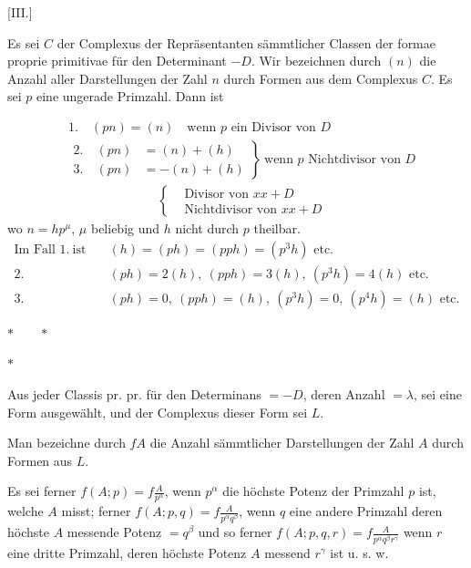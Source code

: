 \par\bigskip{}\centerline{[III.]}\medskip
Es sei $C$ der Complexus der Repräsentanten sämmtlicher Classen der formae proprie primitivae für den Determinant $-D$. Wir bezeichnen durch $(n)$ die Anzahl aller Darstellungen der Zahl $n$ durch Formen aus dem Complexus $C$. Es sei $p$ eine ungerade Primzahl. Dann ist

\[
\begin{aligned}
&1.\quad(pn)=(n)\quad\text{wenn }p\text{ ein Divisor von }D\\
&\left.\begin{aligned}2.\quad(pn)&=(n)+(h)\\3.\quad(pn)&=-(n)+(h)\end{aligned}\right\}
\ \text{wenn }p\text{ Nichtdivisor von }D\\
&\hspace{7em}\left\{\begin{aligned}&\text{Divisor von }xx+D\\&\text{Nichtdivisor von }xx+D\end{aligned}\right.
\end{aligned}
\]
wo $n=hp^\mu$, $\mu$ beliebig und $h$ nicht durch $p$ theilbar.
\[
\begin{aligned}
\text{Im Fall }1.\ \text{ist}\quad&(h)=(ph)=(pph)=(p^3h)\text{ etc.}\\
2.\quad&(ph)=2(h),\ (pph)=3(h),\ (p^3h)=4(h)\text{ etc.}\\
3.\quad&(ph)=0,\ (pph)=(h),\ (p^3h)=0,\ (p^4h)=(h)\text{ etc.}
\end{aligned}
\]
\begin{center}$\ast\qquad\ast$\par$\ast$\end{center}

Aus jeder Classis pr. pr. für den Determinans $=-D$, deren Anzahl $=\lambda$, sei eine Form ausgewählt, und der Complexus dieser Form sei $L$.

Man bezeichne durch $fA$ die Anzahl sämmtlicher Darstellungen der Zahl $A$ durch Formen aus $L$.

Es sei ferner $f(A;p)=f\frac A{p^\alpha}$, wenn $p^\alpha$ die höchste Potenz der Primzahl $p$ ist, welche $A$ misst; ferner $f(A;p,q)=f\frac A{p^\alpha q^\beta}$, wenn $q$ eine andere Primzahl deren höchste $A$ messende Potenz $=q^\beta$ und so ferner $f(A;p,q,r)=f\frac A{p^\alpha q^\beta r^\gamma}$ wenn $r$ eine dritte Primzahl, deren höchste Potenz $A$ messend $r^\gamma$ ist u. s. w.

